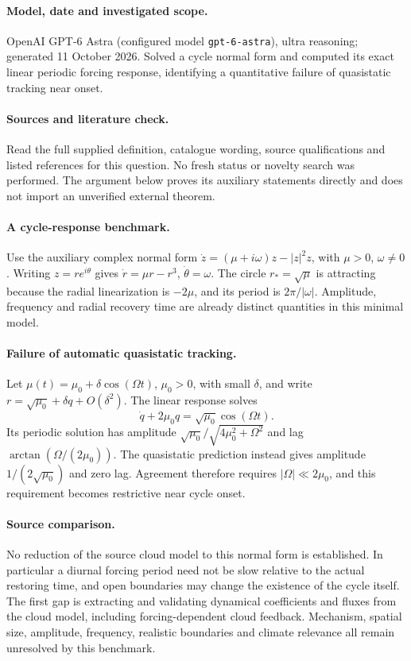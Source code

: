 \documentclass[11pt]{article}
\begin{document}
\paragraph{Model, date and investigated scope.}
OpenAI GPT-6 Astra (configured model \texttt{gpt-6-astra}), ultra reasoning; generated 11 October 2026. Solved a cycle normal form and computed its exact linear periodic forcing response, identifying a quantitative failure of quasistatic tracking near onset.

\paragraph{Sources and literature check.}
Read the full supplied definition, catalogue wording, source qualifications and listed references for this question. No fresh status or novelty search was performed. The argument below proves its auxiliary statements directly and does not import an unverified external theorem.

\paragraph{A cycle-response benchmark.} Use the auxiliary complex normal form \(\dot z=(\mu+i\omega)z-|z|^2z\), with \(\mu>0\), \(\omega\ne0\). Writing \(z=re^{i\theta}\) gives \(\dot r=\mu r-r^3\), \(\dot\theta=\omega\). The circle \(r_* =\sqrt\mu\) is attracting because the radial linearization is \(-2\mu\), and its period is \(2\pi/|\omega|\). Amplitude, frequency and radial recovery time are already distinct quantities in this minimal model.
\paragraph{Failure of automatic quasistatic tracking.} Let \(\mu(t)=\mu_0+\delta\cos(\Omega t)\), \(\mu_0>0\), with small \(\delta\), and write \(r=\sqrt{\mu_0}+\delta q+O(\delta^2)\). The linear response solves
\[
 \dot q+2\mu_0q=\sqrt{\mu_0}\cos(\Omega t).
\]
Its periodic solution has amplitude \(\sqrt{\mu_0}/\sqrt{4\mu_0^2+\Omega^2}\) and lag \(\arctan(\Omega/(2\mu_0))\). The quasistatic prediction instead gives amplitude \(1/(2\sqrt{\mu_0})\) and zero lag. Agreement therefore requires \(|\Omega|\ll2\mu_0\), and this requirement becomes restrictive near cycle onset.
\paragraph{Source comparison.} No reduction of the source cloud model to this normal form is established. In particular a diurnal forcing period need not be slow relative to the actual restoring time, and open boundaries may change the existence of the cycle itself. The first gap is extracting and validating dynamical coefficients and fluxes from the cloud model, including forcing-dependent cloud feedback. Mechanism, spatial size, amplitude, frequency, realistic boundaries and climate relevance all remain unresolved by this benchmark.
\end{document}

